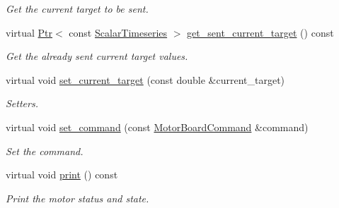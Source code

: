 \begin{DoxyCompactItemize}
\begin{DoxyCompactList}\small\item\em Get the current target to be sent. \end{DoxyCompactList}\item 
virtual \hyperlink{classblmc__drivers_1_1MotorInterface_ae31f230b9da3674a05543023c90b124c}{Ptr}$<$ const \hyperlink{classblmc__drivers_1_1MotorInterface_a49b8fc916b9f9debbd7b0988463db5cd}{Scalar\+Timeseries} $>$ \hyperlink{classblmc__drivers_1_1Motor_aed5e8ee5136b76a94fc17a4430b108c8}{get\+\_\+sent\+\_\+current\+\_\+target} () const
\begin{DoxyCompactList}\small\item\em Get the already sent current target values. \end{DoxyCompactList}\item 
virtual void \hyperlink{classblmc__drivers_1_1Motor_a48801c9858a7b1784b0a0ac4272fdaf5}{set\+\_\+current\+\_\+target} (const double \&current\+\_\+target)
\begin{DoxyCompactList}\small\item\em Setters. \end{DoxyCompactList}\item 
virtual void \hyperlink{classblmc__drivers_1_1Motor_a4af56df5466d011fc2a567dd815a6c1b}{set\+\_\+command} (const \hyperlink{classblmc__drivers_1_1MotorBoardCommand}{Motor\+Board\+Command} \&command)
\begin{DoxyCompactList}\small\item\em Set the command. \end{DoxyCompactList}\item 
virtual void \hyperlink{classblmc__drivers_1_1Motor_a2779f53af7b066254cac47bf07a162a4}{print} () const
\begin{DoxyCompactList}\small\item\em Print the motor status and state. \end{DoxyCompactList}\end{DoxyCompactItemize}
